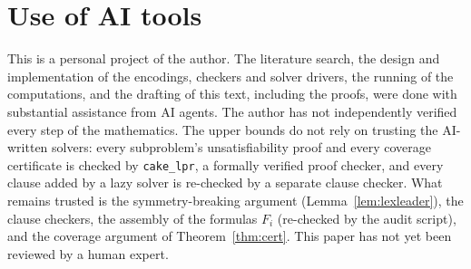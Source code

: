 \documentclass[11pt]{amsart}
\theoremstyle{definition}
\theoremstyle{remark}
\begin{document}
\section*{Use of AI tools}
This is a personal project of the author. The literature search, the design and implementation of the encodings, checkers and
solver drivers, the running of the computations, and the drafting of this text, including the proofs, were done with substantial
assistance from AI agents. The author has not independently verified every step of the mathematics. The upper bounds do not rely on
trusting the AI-written solvers: every subproblem's unsatisfiability proof and every coverage certificate is checked by
\texttt{cake\_lpr}, a formally verified proof checker, and every clause added by a lazy solver is re-checked by a separate clause
checker. What remains trusted is the symmetry-breaking argument (Lemma~\ref{lem:lexleader}), the clause checkers, the assembly of
the formulas $F_i$ (re-checked by the audit script), and the coverage argument of Theorem~\ref{thm:cert}. This paper has not yet been
reviewed by a human expert.
\end{document}
